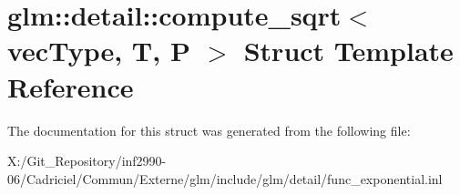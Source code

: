 \hypertarget{structglm_1_1detail_1_1compute__sqrt}{\section{glm\-:\-:detail\-:\-:compute\-\_\-sqrt$<$ vec\-Type, T, P $>$ Struct Template Reference}
\label{structglm_1_1detail_1_1compute__sqrt}
}


The documentation for this struct was generated from the following file\-:\begin{DoxyCompactItemize}
\item 
X\-:/\-Git\-\_\-\-Repository/inf2990-\/06/\-Cadriciel/\-Commun/\-Externe/glm/include/glm/detail/func\-\_\-exponential.\-inl\end{DoxyCompactItemize}
